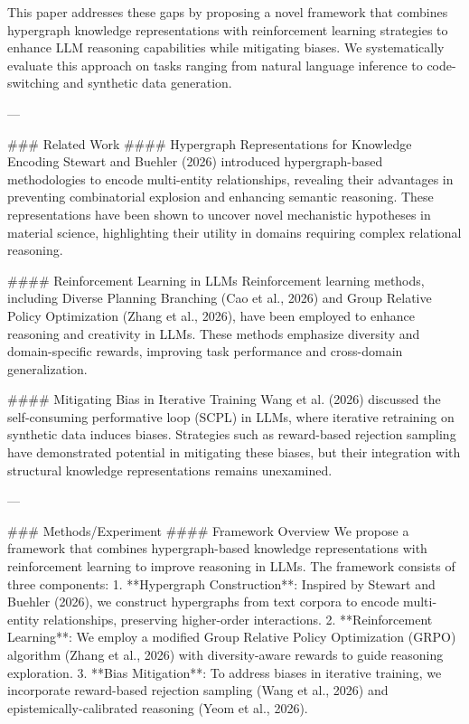 This paper addresses these gaps by proposing a novel framework that combines hypergraph knowledge representations with reinforcement learning strategies to enhance LLM reasoning capabilities while mitigating biases. We systematically evaluate this approach on tasks ranging from natural language inference to code-switching and synthetic data generation.

---

### Related Work
#### Hypergraph Representations for Knowledge Encoding
Stewart and Buehler (2026) introduced hypergraph-based methodologies to encode multi-entity relationships, revealing their advantages in preventing combinatorial explosion and enhancing semantic reasoning. These representations have been shown to uncover novel mechanistic hypotheses in material science, highlighting their utility in domains requiring complex relational reasoning.

#### Reinforcement Learning in LLMs
Reinforcement learning methods, including Diverse Planning Branching (Cao et al., 2026) and Group Relative Policy Optimization (Zhang et al., 2026), have been employed to enhance reasoning and creativity in LLMs. These methods emphasize diversity and domain-specific rewards, improving task performance and cross-domain generalization.

#### Mitigating Bias in Iterative Training
Wang et al. (2026) discussed the self-consuming performative loop (SCPL) in LLMs, where iterative retraining on synthetic data induces biases. Strategies such as reward-based rejection sampling have demonstrated potential in mitigating these biases, but their integration with structural knowledge representations remains unexamined.

---

### Methods/Experiment
#### Framework Overview
We propose a framework that combines hypergraph-based knowledge representations with reinforcement learning to improve reasoning in LLMs. The framework consists of three components:
1. **Hypergraph Construction**: Inspired by Stewart and Buehler (2026), we construct hypergraphs from text corpora to encode multi-entity relationships, preserving higher-order interactions.
2. **Reinforcement Learning**: We employ a modified Group Relative Policy Optimization (GRPO) algorithm (Zhang et al., 2026) with diversity-aware rewards to guide reasoning exploration.
3. **Bias Mitigation**: To address biases in iterative training, we incorporate reward-based rejection sampling (Wang et al., 2026) and epistemically-calibrated reasoning (Yeom et al., 2026).

